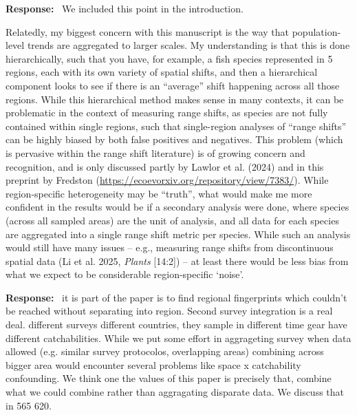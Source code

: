 \documentclass[11pt]{article}
\newcommand{\reviewer}[1]{\par\medskip\noindent\textcolor{revcolor}{#1}\par}
\newenvironment{reply}
{\par\smallskip\begingroup\color{replycolor}\noindent\textbf{Response:}\ }
{\endgroup\par\medskip}
\begin{document}
\begin{reply}
We included this point in the introduction.
\end{reply}

\reviewer{Relatedly, my biggest concern with this manuscript is the way that
population-level trends are aggregated to larger scales. My understanding is that
this is done hierarchically, such that you have, for example, a fish species
represented in 5 regions, each with its own variety of spatial shifts, and then a
hierarchical component looks to see if there is an ``average'' shift happening
across all those regions. While this hierarchical method makes sense in many
contexts, it can be problematic in the context of measuring range shifts, as
species are not fully contained within single regions, such that single-region
analyses of ``range shifts'' can be highly biased by both false positives and
negatives. This problem (which is pervasive within the range shift literature) is
of growing concern and recognition, and is only discussed partly by Lawlor et al.
(2024) and in this preprint by Fredston
(\url{https://ecoevorxiv.org/repository/view/7383/}). While region-specific
heterogeneity may be ``truth'', what would make me more confident in the results
would be if a secondary analysis were done, where species (across all sampled
areas) are the unit of analysis, and all data for each species are aggregated into
a single range shift metric per species. While such an analysis would still have
many issues -- e.g., measuring range shifts from discontinuous spatial data (Li et
al. 2025, \textit{Plants} [14:2]) -- at least there would be less bias from what we
expect to be considerable region-specific `noise'.}

\begin{reply}
it is  part of the paper is to find regional fingerprints which couldn't be reached without separating into region. Second survey integration is a real deal. different surveys different countries, they sample in different time gear have different catchabilities. While we put some effort in aggrageting survey when data allowed (e.g. similar survey protocolos, overlapping areas) combining across bigger area would encounter several problems like space x catchability confounding. We think one the values of this paper is precisely that, combine what we could combine rather than aggragating disparate data. We discuss that in 565 620. 
\end{reply}
\end{document}
